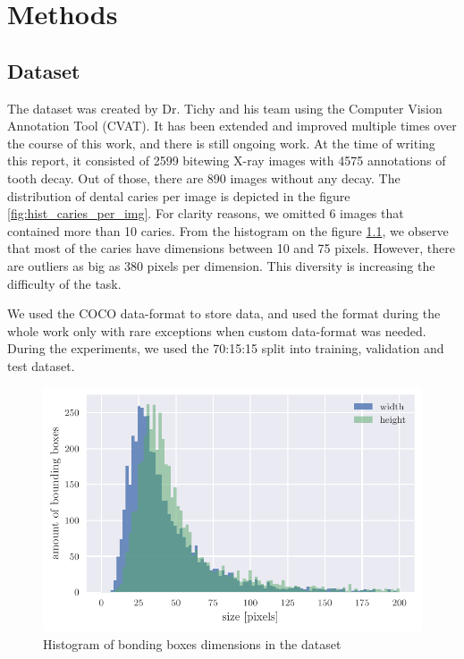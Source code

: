 \chapter{Methods}
\label{chapter:methods}
\section{Dataset}
The dataset was created by Dr. Tichy and his team using the Computer Vision Annotation Tool (CVAT). It has been extended and improved multiple times over the course of this work, and there is still ongoing work. At the time of writing this report, it consisted of 2599 bitewing X-ray images with 4575 annotations of tooth decay. Out of those, there are 890 images without any decay. The distribution of dental caries per image is depicted in the figure \ref{fig:hist_caries_per_img}. For clarity reasons, we omitted 6 images that contained more than 10 caries. From the histogram on the figure \ref{fig:hist_caries_dim}, we observe that most of the caries have dimensions between 10 and 75 pixels. However, there are outliers as big as 380 pixels per dimension. This diversity is increasing the difficulty of the task.

We used the COCO data-format to store data, and used the format during the whole work only with rare exceptions when custom data-format was needed. During the experiments, we used the 70:15:15 split into training, validation and test dataset.
\begin{figure}
    \includegraphics[width = \linewidth]{images/dataset_histogram.pdf}
    \caption{Histogram of bonding boxes dimensions in the dataset}
    \label{fig:hist_caries_dim}
\end{figure}

